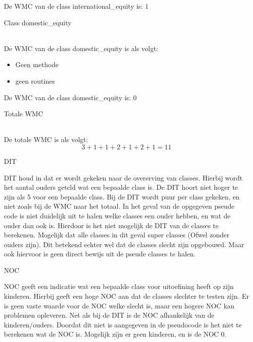 \documentclass[a4paper,titlepage]{artikel1}
\begin{document}
    De WMC van de class international\_equity is: 1\\
    \begin{bf}Class domestic\_equity\end{bf}\\
    De WMC van de class domestic\_equity is als volgt:
    \begin{itemize}
      \item Geen methode
      \item geen routines
    \end{itemize}
    De WMC van de class domestic\_equity is: 0 \\
    \begin{bf}Totale WMC\end{bf}\\
      De totale WMC is als volgt: \\
      \begin{displaymath}
        3 + 1 + 1 + 2 + 1 + 2 + 1 = 11
      \end{displaymath}
   \begin{center}\begin{bf}DIT\end{bf}\end{center}
    DIT houd in dat er wordt gekeken naar de overerving van classes. Hierbij wordt het aantal ouders geteld wat een bepaalde class is. De DIT hoort niet hoger te zijn als 5 voor een bepaalde class. Bij de DIT wordt puur per class gekeken, en niet zoals bij de WMC naar het totaal. In het geval van de opgegeven pseude code is niet duidelijk uit te halen welke classes een ouder hebben, en wat de ouder dan ook is. Hierdoor is het niet mogelijk de DIT van de classes te berekenen. Mogelijk dat alle classes in dit geval super classes (Ofwel zonder ouders zijn). Dit betekend echter wel dat de classes slecht zijn opgebouwd. Maar ook hiervoor is geen direct bewijs uit de pseude classes te halen. 
   \begin{center}\begin{bf}NOC\end{bf}\end{center}
   NOC geeft een indicatie wat een bepaalde class voor uitoefining heeft op zijn kinderen. Hierbij geeft een hoge NOC aan dat de classes slechter te testen zijn. Er is geen vaste waarde voor de NOC welke slecht is, maar een hogere NOC kan problemen opleveren. Net als bij de DIT is de NOC afhankelijk van de kinderen/ouders. Doordat dit niet is aangegeven in de pseudocode is het niet te berekenen wat de NOC is. Mogelijk zijn er geen kinderen, en is de NOC 0.
\end{document}
